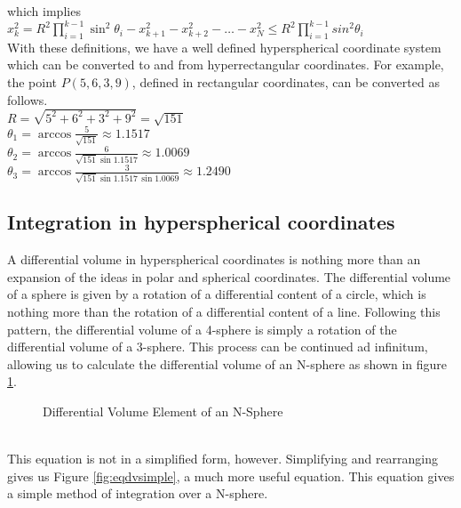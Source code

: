 \documentclass [letterpaper]{article}
\begin{document}
which implies\\$x_k^2=R^2\prod\limits_{i=1}^{k-1}\sin^2\theta_i-x_{k+1}^2-x_{k+2}^2-\dots-x_N^2\le R^2\prod\limits_{i=1}^{k-1}sin^2\theta_i$\\
With these definitions, we have a well defined hyperspherical coordinate system which can be converted to and from hyperrectangular coordinates. For example, the point $P(5,6,3,9)$, defined in rectangular coordinates, can be converted as follows.\\
$R=\sqrt{5^2+6^2+3^2+9^2}=\sqrt{151}$\\
$\theta_1=\arccos\frac{5}{\sqrt{151}}\approx 1.1517$\\
$\theta_2=\arccos\frac{6}{\sqrt{151}\sin 1.1517}\approx 1.0069$\\
$\theta_3=\arccos\frac{3}{\sqrt{151}\sin 1.1517\,\sin 1.0069}\approx 1.2490$\\
\subsection{\label{ss:proof_int}Integration in hyperspherical coordinates}
A differential volume in hyperspherical coordinates is nothing more than an expansion of the ideas in polar and spherical coordinates. The differential volume of a sphere is given by a rotation of a differential content of a circle, which is nothing more than the rotation of a differential content of a line. Following this pattern, the differential volume of a 4-sphere is simply a rotation of the differential volume of a 3-sphere. This process can be continued ad infinitum, allowing us to calculate the differential volume of an N-sphere as shown in figure \ref{fig:eqdv}.\\
\begin{figure}[h]
\caption{\label{fig:eqdv}Differential Volume Element of an N-Sphere}
\end{figure}\\
This equation is not in a simplified form, however. Simplifying and rearranging gives us Figure \ref{fig:eqdvsimple}, a much more useful equation. This equation gives a simple method of integration over a N-sphere.
\end{document}
